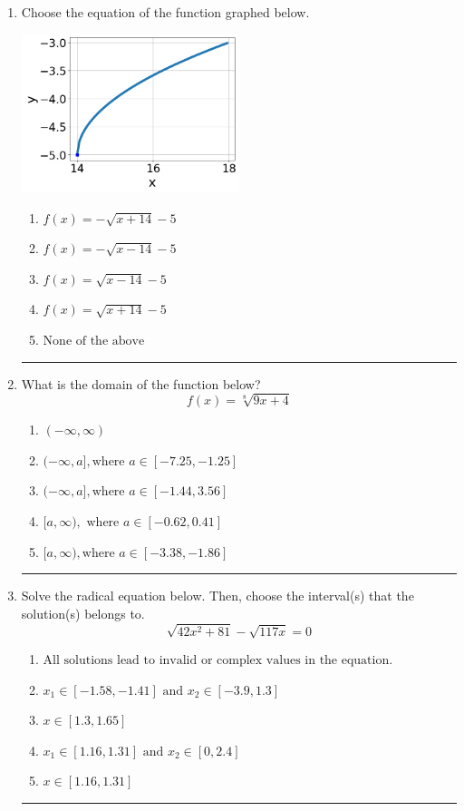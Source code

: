 \documentclass[14pt]{extbook}
\newcommand{\litem}[1]{\item#1\hspace*{-1cm}\rule{\textwidth}{0.4pt}}
\begin{document}
\begin{enumerate}
\litem{
Choose the equation of the function graphed below.
\begin{center}
    \includegraphics[width=0.5\textwidth]{../Figures/radicalGraphToEquationCopyA.png}
\end{center}
\begin{enumerate}[label=\Alph*.]
\item \( f(x) = - \sqrt{x + 14} - 5 \)
\item \( f(x) = - \sqrt{x - 14} - 5 \)
\item \( f(x) = \sqrt{x - 14} - 5 \)
\item \( f(x) = \sqrt{x + 14} - 5 \)
\item \( \text{None of the above} \)

\end{enumerate} }
\litem{
What is the domain of the function below?\[ f(x) = \sqrt[8]{9 x + 4} \]\begin{enumerate}[label=\Alph*.]
\item \( (-\infty, \infty) \)
\item \( (-\infty, a], \text{where } a \in [-7.25, -1.25] \)
\item \( (-\infty, a], \text{where } a \in [-1.44, 3.56] \)
\item \( [a, \infty), \text{ where } a \in [-0.62, 0.41] \)
\item \( [a, \infty), \text{where } a \in [-3.38, -1.86] \)

\end{enumerate} }
\litem{
Solve the radical equation below. Then, choose the interval(s) that the solution(s) belongs to.\[ \sqrt{42 x^2 + 81} - \sqrt{117 x} = 0 \]\begin{enumerate}[label=\Alph*.]
\item \( \text{All solutions lead to invalid or complex values in the equation.} \)
\item \( x_1 \in [-1.58, -1.41] \text{ and } x_2 \in [-3.9,1.3] \)
\item \( x \in [1.3,1.65] \)
\item \( x_1 \in [1.16, 1.31] \text{ and } x_2 \in [0,2.4] \)
\item \( x \in [1.16,1.31] \)


\end{enumerate}}
\end{enumerate}
\end{document}
